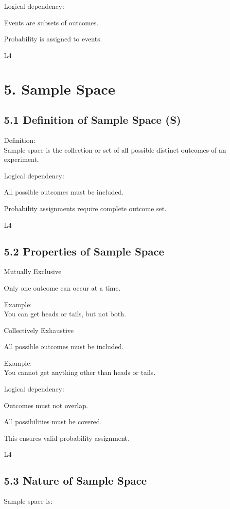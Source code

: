 \documentclass[12pt]{article}
\begin{document}
Logical dependency:

Events are subsets of outcomes.

Probability is assigned to events. 

L4

\section*{5. Sample Space}

\subsection*{5.1 Definition of Sample Space (S)}

Definition: \\
Sample space is the collection or set of all possible distinct outcomes of an experiment.

Logical dependency:

All possible outcomes must be included.

Probability assignments require complete outcome set. 

L4

\subsection*{5.2 Properties of Sample Space}

Mutually Exclusive

Only one outcome can occur at a time.

Example: \\
You can get heads or tails, but not both.

Collectively Exhaustive

All possible outcomes must be included.

Example: \\
You cannot get anything other than heads or tails.

Logical dependency:

Outcomes must not overlap.

All possibilities must be covered.

This ensures valid probability assignment. 

L4

\subsection*{5.3 Nature of Sample Space}

Sample space is:
\end{document}
